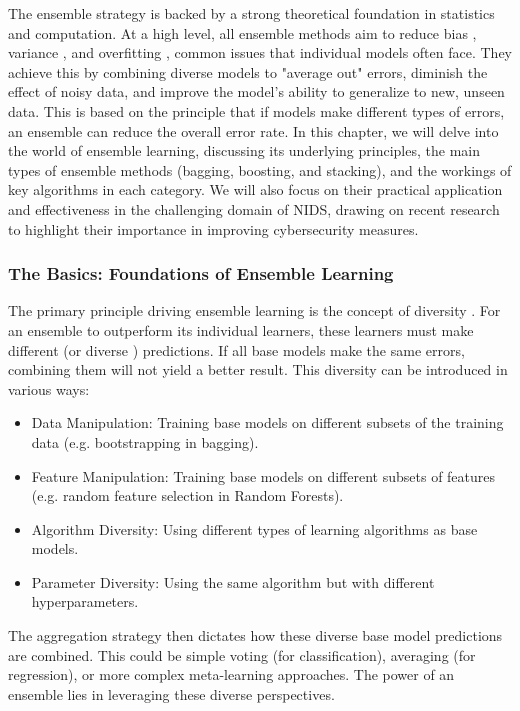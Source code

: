 The ensemble strategy is backed by a strong theoretical foundation in statistics and computation. At a high level, all ensemble methods aim to reduce bias , variance , and overfitting , common issues that individual models often face. They achieve this by combining diverse models to "average out" errors, diminish the effect of noisy data, and improve the model's ability to generalize to new, unseen data. This is based on the principle that if models make different types of errors, an ensemble can reduce the overall error rate. In this chapter, we will delve into the world of ensemble learning, discussing its underlying principles, the main types of ensemble methods (bagging, boosting, and stacking), and the workings of key algorithms in each category. We will also focus on their practical application and effectiveness in the challenging domain of NIDS, drawing on recent research to highlight their importance in improving cybersecurity measures.

\subsubsection{The Basics: Foundations of Ensemble Learning} 
The primary principle driving ensemble learning is the concept of diversity . For an ensemble to outperform its individual learners, these learners must make different (or diverse ) predictions. If all base models make the same errors, combining them will not yield a better result. This diversity can be introduced in various ways:
\begin{itemize}[noitemsep] 
\item Data Manipulation: Training base models on different subsets of the training data (e.g. bootstrapping in bagging). 
\item Feature Manipulation: Training base models on different subsets of features (e.g. random feature selection in Random Forests). 
\item Algorithm Diversity: Using different types of learning algorithms as base models.
\item Parameter Diversity: Using the same algorithm but with different hyperparameters.
\end{itemize} 
The aggregation strategy then dictates how these diverse base model predictions are combined. This could be simple voting (for classification), averaging (for regression), or more complex meta-learning approaches. The power of an ensemble lies in leveraging these diverse perspectives.


